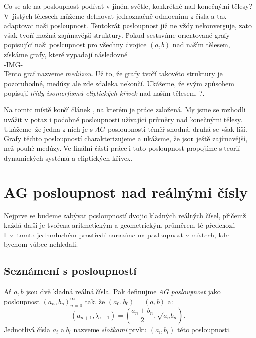 \documentclass[12pt]{report}
\begin{document}
Co se ale na posloupnost podívat v jiném světle, konkrétně nad konečnými tělesy? V~jistých tělesech můžeme definovat jednoznačně  odmocninu z čísla a tak adaptovat naši posloupnost. Tentokrát posloupnost již ne vždy nekonverguje, zato však tvoří možná zajímavější struktury. Pokud sestavíme orientované grafy popisující naši posloupnost pro všechny dvojice $(a,b)$ nad naším tělesem, získáme grafy, které vypadají následovně:\\
-IMG-\\
Tento graf nazveme \textit{medúzou}. Už to, že grafy tvoří takovéto struktury je pozoruhodné, medúzy ale zde zdaleka nekončí. Ukážeme, že svým způsobem popisují \textit{třídy isomorfismů eliptických křivek} nad naším tělesem, ?. 

Na tomto místě končí článek \cite{Meduza}, na kterém je práce založená. My jsme se rozhodli uvážit v potaz i podobné posloupnosti užívající průměry nad konečnými tělesy. Ukážeme, že jedna z nich je s $AG$ posloupnosti téměř shodná, druhá se však liší. Grafy těchto posloupností charakterizujeme a ukážeme, že jsou ještě zajímavější, než pouhé medúzy. Ve finální části práce i tuto posloupnost propojíme s teorií dynamických systémů a eliptických křivek.

\chapter{AG posloupnost nad reálnými čísly}


Nejprve se budeme zabývat posloupností dvojic kladných reálných čísel, přičemž každá další je tvořena aritmetickým a geometrickým průměrem té předchozí. I~v~tomto jednoduchém prostředí narazíme na posloupnost v místech, kde bychom vůbec nehledali.

\section{Seznámení s posloupností}


\begin{definice}
Ať $a,b$ jsou dvě kladná reálná čísla. Pak definujme \textit{AG posloupnost} jako posloupnost $(a_n,b_n)_{n=0}^{\infty}$ tak, že $(a_0,b_0) = (a,b)$ a:
$$\left(a_{n+1},b_{n+1} \right) = \left(\frac{a_n+b_n}{2}, \sqrt{a_n b_n} \right).$$
Jednotlivá čísla $a_i$ a $b_i$ nazveme \textit{složkami} prvku $(a_i,b_i)$ této posloupnosti.
\end{definice}
\end{document}
